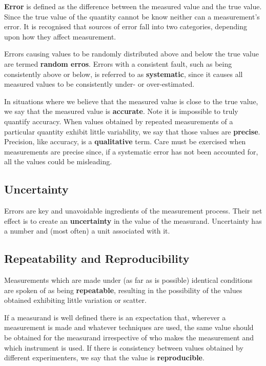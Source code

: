 \textbf{Error} is defined as the difference between the measured value and the true value. Since the true value of the quantity cannot be know neither can a measurement's error. It is recognised that sources of error fall into two categories, depending upon how they affect measurement.


Errors causing values to be randomly distributed above and below the true value are termed \textbf{random erros}. Errors with a consistent fault, such as being consistently above or below, is referred to as \textbf{systematic}, since it causes all measured values to be consistently under- or over-estimated.


In situations where we believe that the measured value is close to the true value, we say that the measured value is \textbf{accurate}. Note it is impossible to truly quantify accuracy. When values obtained by repeated measurements of a particular quantity exhibit little variability, we say that those values are \textbf{precise}. Precision, like accuracy, is a \textbf{qualitative} term. Care must be exercised when measurements are precise since, if a systematic error has not been accounted for, all the values could be misleading.


\subsection{Uncertainty}

Errors are key and unavoidable ingredients of the measurement process. Their net effect is to create an \textbf{uncertainty} in the value of the measurand. Uncertainty has a number and (most often) a unit associated with it.


\subsection{Repeatability and Reproducibility}

Measurements which are made under (as far as is possible) identical conditions are spoken of as being \textbf{repeatable}, resulting in the possibility of the values obtained exhibiting little variation or scatter.


If a measurand is well defined there is an expectation that, wherever a measurement is made and whatever techniques are used, the same value should be obtained for the measurand irrespective of who makes the measurement and which instrument is used. If there is consistency between values obtained by different experimenters, we say that the value is \textbf{reproducible}.



